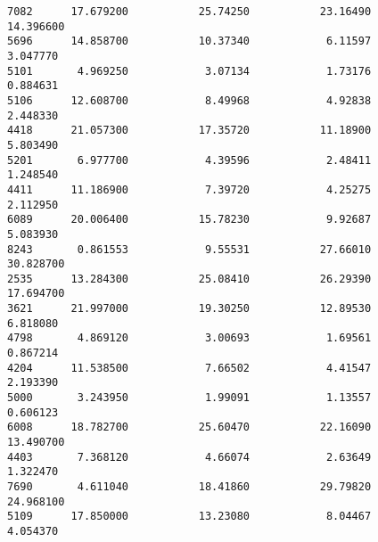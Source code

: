 \documentclass[11pt]{article}
\begin{document}
\begin{verbatim}
7082      17.679200           25.74250           23.16490          14.396600   
5696      14.858700           10.37340            6.11597           3.047770   
5101       4.969250            3.07134            1.73176           0.884631   
5106      12.608700            8.49968            4.92838           2.448330   
4418      21.057300           17.35720           11.18900           5.803490   
5201       6.977700            4.39596            2.48411           1.248540   
4411      11.186900            7.39720            4.25275           2.112950   
6089      20.006400           15.78230            9.92687           5.083930   
8243       0.861553            9.55531           27.66010          30.828700   
2535      13.284300           25.08410           26.29390          17.694700   
3621      21.997000           19.30250           12.89530           6.818080   
4798       4.869120            3.00693            1.69561           0.867214   
4204      11.538500            7.66502            4.41547           2.193390   
5000       3.243950            1.99091            1.13557           0.606123   
6008      18.782700           25.60470           22.16090          13.490700   
4403       7.368120            4.66074            2.63649           1.322470   
7690       4.611040           18.41860           29.79820          24.968100   
5109      17.850000           13.23080            8.04467           4.054370   


\end{verbatim}
\end{document}
